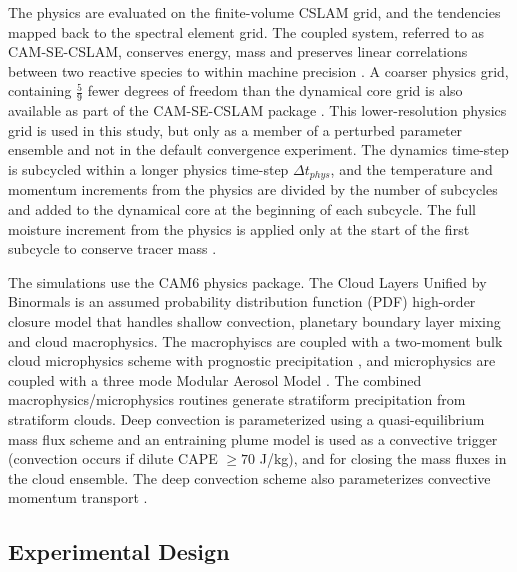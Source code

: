 \documentclass[times]{qjrms4}
\begin{document}
The physics are evaluated on the finite-volume CSLAM grid, and the tendencies mapped back to the spectral element grid. The coupled system, referred to as CAM-SE-CSLAM, conserves energy, mass and preserves linear correlations between two reactive species to within machine precision \citep{HL2018MWR}. A coarser physics grid, containing $\frac{5}{9}$ fewer degrees of freedom than the dynamical core grid is also available as part of the CAM-SE-CSLAM package \citep{HETAL2019JAMES}. This lower-resolution physics grid is used in this study, but only as a member of a perturbed parameter ensemble and not in the default convergence experiment. The dynamics time-step is subcycled within a longer physics time-step $\Delta t_{phys}$, and the temperature and momentum increments from the physics are divided by the number of subcycles and added to the dynamical core at the beginning of each subcycle. The full moisture increment from the physics is applied only at the start of the first subcycle to conserve tracer mass \citep[$ftype=2$ option in][]{LW2019JAMES}.

The simulations use the CAM6 physics package. The Cloud Layers Unified by Binormals \citep[CLUBB][]{GETAL2002JAS,BOG2013JCLIM} is an assumed probability distribution function (PDF) high-order closure model that handles shallow convection, planetary boundary layer mixing and cloud macrophysics. The macrophyiscs are coupled with a two-moment bulk cloud microphysics scheme with prognostic precipitation \citep{MG2}, and microphysics are coupled with a three mode Modular Aerosol Model \citep{MAM}. The combined macrophysics/microphysics routines generate stratiform precipitation from stratiform clouds. Deep convection is parameterized using a quasi-equilibrium mass flux scheme \citep{ZM1995AO} and an entraining plume model \citep[referred to as the dilute convective available potential energy, or {\em{dilute CAPE}} hereafter;][]{RB1992JAS, NRJ2008JC} is used as a convective trigger (convection occurs if dilute CAPE $\geq 70$ J/kg), and for closing the mass fluxes in the cloud ensemble. The deep convection scheme also parameterizes convective momentum transport \citep{RR2008JC}.

\subsection{Experimental Design}
 
\end{document}
